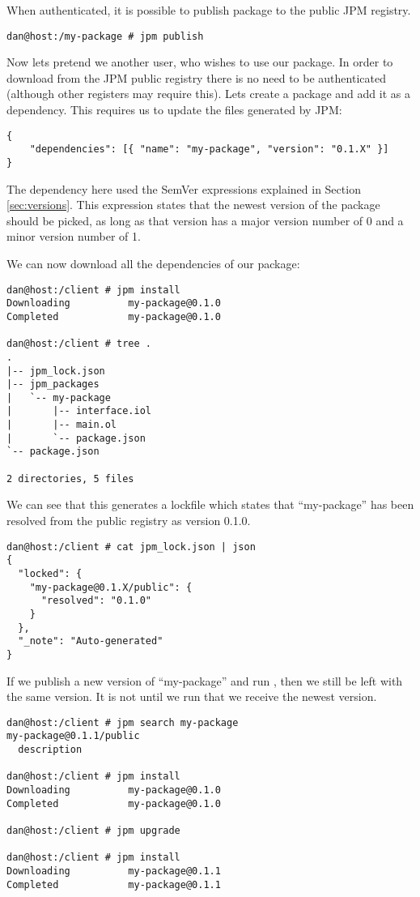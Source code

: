 When authenticated, it is possible to publish package to the public JPM
registry.

\begin{verbatim}
dan@host:/my-package # jpm publish
\end{verbatim}

Now lets pretend we another user, who wishes to use our package. In order to
download from the JPM public registry there is no need to be authenticated
(although other registers may require this). Lets create a package and add it
as a dependency. This requires us to update the  files
generated by JPM:

\begin{verbatim}
{
    "dependencies": [{ "name": "my-package", "version": "0.1.X" }]
}
\end{verbatim}

The dependency here used the SemVer expressions explained in Section
\ref{sec:versions}. This expression states that the newest version of the
package should be picked, as long as that version has a major version number of
0 and a minor version number of 1.

We can now download all the dependencies of our package:

\begin{verbatim}
dan@host:/client # jpm install
Downloading          my-package@0.1.0
Completed            my-package@0.1.0

dan@host:/client # tree .
.
|-- jpm_lock.json
|-- jpm_packages
|   `-- my-package
|       |-- interface.iol
|       |-- main.ol
|       `-- package.json
`-- package.json

2 directories, 5 files
\end{verbatim}

We can see that this generates a lockfile which states that ``my-package'' has
been resolved from the public registry as version 0.1.0.

\begin{verbatim}
dan@host:/client # cat jpm_lock.json | json
{
  "locked": {
    "my-package@0.1.X/public": {
      "resolved": "0.1.0"
    }
  },
  "_note": "Auto-generated"
}
\end{verbatim}

If we publish a new version of ``my-package'' and run , then
we still be left with the same version. It is not until we run 
that we receive the newest version.

\begin{verbatim}
dan@host:/client # jpm search my-package
my-package@0.1.1/public
  description

dan@host:/client # jpm install
Downloading          my-package@0.1.0
Completed            my-package@0.1.0

dan@host:/client # jpm upgrade

dan@host:/client # jpm install
Downloading          my-package@0.1.1
Completed            my-package@0.1.1
\end{verbatim}

